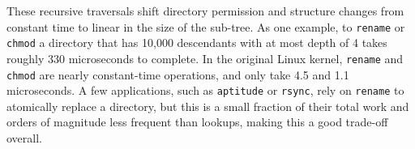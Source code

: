 These recursive traversals shift directory permission and structure changes 
from constant time to linear in the size of the sub-tree.
As one example, 
 to {\tt rename} or {\tt chmod} a directory that has
10,000 descendants with at most depth of 4
takes roughly 330 microseconds to complete. 
In the original Linux kernel, {\tt rename} and {\tt chmod} are nearly constant-time operations, and only take 4.5 and 1.1 microseconds.
A few applications, such as {\tt aptitude} or {\tt rsync},
rely on {\tt rename} to atomically replace a directory, 
but this is a small fraction of their total work %
and orders of magnitude less frequent than lookups, making this a good trade-off overall.

